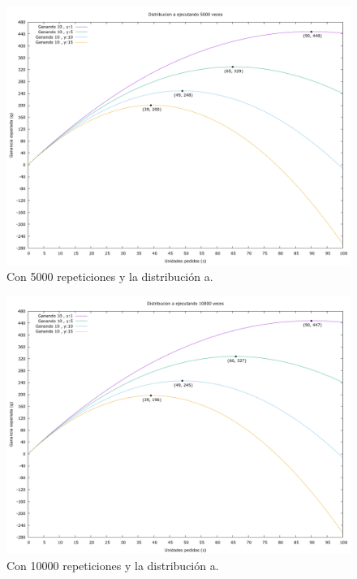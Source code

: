 \documentclass[12pt, spanish]{article}
\begin{document}
\begin{figure}[H]
	\centering
	\includegraphics[scale = 0.3]{prob_a/datos_a_5000.png}
	\caption{Con 5000 repeticiones y la distribución a.}
	\label{fig:ej1_a_5000}

\end{figure}


\begin{figure}[H]
	\centering
	\includegraphics[scale = 0.3]{prob_a/datos_a_10000.png}
	\caption{Con 10000 repeticiones y la distribución a.}
	\label{fig:ej1_a_10000}

\end{figure}
\end{document}
